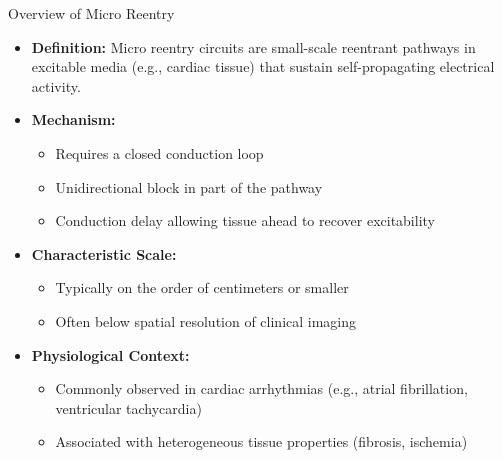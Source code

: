 \documentclass[aspectratio=43]{beamer}
\begin{document}
\begin{frame}{Overview of Micro Reentry}
\begin{itemize}
    \item \textbf{Definition:} Micro reentry circuits are small-scale reentrant 
		pathways in excitable media (e.g., cardiac tissue) that sustain 
		self-propagating electrical activity.\cite{aha_microreentry2016}

    \item \textbf{Mechanism:}
    \begin{itemize}
        \item Requires a closed conduction loop
        \item Unidirectional block in part of the pathway
        \item Conduction delay allowing tissue ahead to recover excitability
    \end{itemize}

	\item \textbf{Characteristic Scale:} 
    \begin{itemize}
        \item Typically on the order of centimeters or smaller
        \item Often below spatial resolution of clinical imaging
    \end{itemize}

    \item \textbf{Physiological Context:}
    \begin{itemize}
        \item Commonly observed in cardiac arrhythmias (e.g., atrial 
			fibrillation, ventricular tachycardia)
        \item Associated with heterogeneous tissue properties (fibrosis, ischemia)
    \end{itemize}

\end{itemize}
\vspace{-5pt}

\end{frame}
\end{document}
